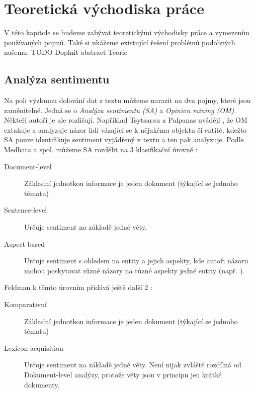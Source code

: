 \chapter{Teoretická východiska práce}

\begin{chapterabstract}
	V této kapitole se budeme zabývat teoretickými východisky práce a vymezením používaných pojmů.
	 Také si ukážeme existující řešení problémů podobných našemu.
	 TODO Doplnit abstract Teorie
\end{chapterabstract}

\section{Analýza sentimentu}
Na poli výzkumu dolování dat z textu můžeme narazit na dva pojmy, které jsou zaměnitelné. Jedná se o \textit{Analýzu sentimentu (SA)} a \textit{Opinion mining (OM)}. \cite{Medhat} Někteří autoři je ale rozlišují. Například Tsytsarau a Palpanas uvádějí \cite{survey}, že OM extahuje a analyzuje názor lidí vázající se k nějakému objektu či entitě, kdežto SA pouze identifikuje sentiment vyjádřený v textu a ten pak analyzuje. 
Podle Medhata a spol. můžeme SA rozdělit na 3 klasifikační úrovně \cite{Medhat}:
\begin{description}
	\item[Document-level] Základní jednotkou informace je jeden dokument (týkající se jednoho tématu)

	\item[Sentence-level] Určuje sentiment na základě jedné věty. 
	
	\item[Aspect-based] Určuje sentiment s ohledem na entity a jejich aspekty, kde autoři názoru mohou poskytovat různé názory na různé aspekty jedné entity (např. ).
\end{description}

Feldman k těmto úrovním přidává ještě další 2 \cite{Feldman}:
\begin{description}
	\item[Komparativní] Základní jednotkou informace je jeden dokument (týkající se jednoho tématu)
	
	\item[Lexicon acquisition] Určuje sentiment na základě jedné věty. Není nijak zvláště rozdílná od Dokument-level analýzy, protože věty jsou v principu jen krátké dokumenty. 
	
\end{description}

